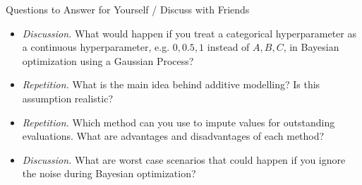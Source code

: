 \begin{frame}[c]{Questions to Answer for Yourself / Discuss with Friends}

\begin{itemize}
\item \emph{Discussion.} What would happen if you treat a categorical hyperparameter as a continuous hyperparameter, e.g. ${0, 0.5, 1}$ instead of ${A, B, C}$, in Bayesian optimization using a Gaussian Process?
\item \emph{Repetition.} What is the main idea behind additive modelling? Is this assumption realistic?
\item \emph{Repetition.} Which method can you use to impute values for outstanding evaluations. What are advantages and disadvantages of each method?
\item \emph{Discussion.} What are worst case scenarios that could happen if you ignore the noise during Bayesian optimization?
\end{itemize}
\end{frame}